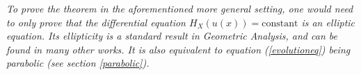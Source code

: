 \begin{oss}
	\em To prove the theorem in the aforementioned more general setting, one would need to only prove that the differential equation $H_X(u(x))= \mathrm{constant}$ is an elliptic equation. Its ellipticity is a standard result in Geometric Analysis, and can be found in many other works. It is also equivalent to equation (\ref{evolutioneq}) being parabolic (see section \ref{parabolic}).
\end{oss}
